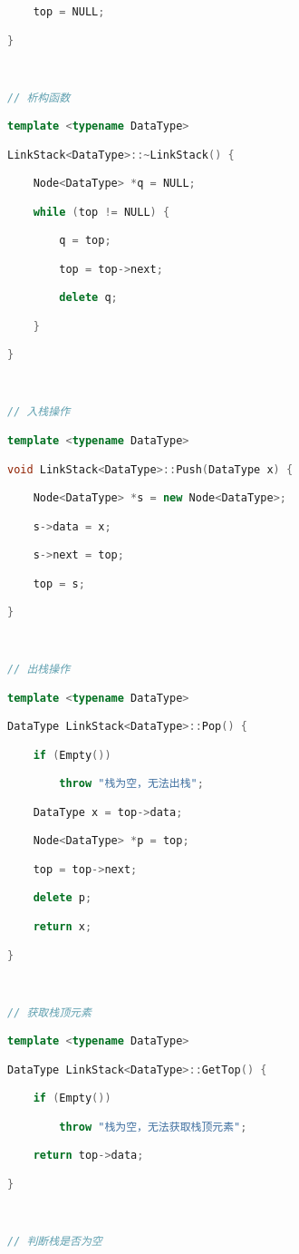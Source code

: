 \begin{lstlisting}[language=C++]
    top = NULL;

}

  

// 析构函数

template <typename DataType>

LinkStack<DataType>::~LinkStack() {

    Node<DataType> *q = NULL;

    while (top != NULL) {

        q = top;

        top = top->next;

        delete q;

    }

}

  

// 入栈操作

template <typename DataType>

void LinkStack<DataType>::Push(DataType x) {

    Node<DataType> *s = new Node<DataType>;

    s->data = x;

    s->next = top;

    top = s;

}

  

// 出栈操作

template <typename DataType>

DataType LinkStack<DataType>::Pop() {

    if (Empty())

        throw "栈为空，无法出栈";

    DataType x = top->data;

    Node<DataType> *p = top;

    top = top->next;

    delete p;

    return x;

}

  

// 获取栈顶元素

template <typename DataType>

DataType LinkStack<DataType>::GetTop() {

    if (Empty())

        throw "栈为空，无法获取栈顶元素";

    return top->data;

}

  

// 判断栈是否为空


\end{lstlisting}
